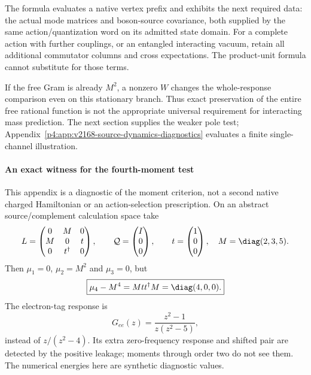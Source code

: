 \documentclass[12pt,a4paper]{article}
\begin{document}
The formula evaluates a native vertex prefix and exhibits the next required
data: the actual mode matrices and boson-source covariance, both supplied by
the same action/quantization word on its admitted state domain. For a complete
action with further couplings, or an entangled interacting vacuum, retain all
additional commutator columns and cross expectations. The product-unit
formula cannot substitute for those terms.

If the free Gram is already $M^2$, a nonzero $W$ changes the whole-response
comparison even on this stationary branch. Thus exact preservation of the
entire free rational function is not the appropriate universal requirement
for interacting mass prediction. The next section supplies the weaker pole
test; Appendix~\ref{p4:app:v2168-source-dynamics-diagnostics} evaluates a finite single-channel illustration.



\paragraph{An exact witness for the fourth-moment test}
This appendix is a diagnostic of the moment criterion, not a second native
charged Hamiltonian or an action-selection prescription. On an abstract
source/complement calculation space take
\[
 L=\begin{pmatrix}0&M&0\\M&0&t\\0&t^\dagger&0\end{pmatrix},
 \qquad \mathcal Q=\begin{pmatrix}I\\0\\0\end{pmatrix},
 \qquad t=\begin{pmatrix}1\\0\\0\end{pmatrix},\quad
 M=\diag(2,3,5).
\]
Then $\mu_1=0$, $\mu_2=M^2$ and $\mu_3=0$, but
\[
 \boxed{\mu_4-M^4=Mtt^\dagger M=\diag(4,0,0).}
\]
The electron-tag response is
\[
 G_{ee}(z)=\frac{z^2-1}{z(z^2-5)},
\]
instead of $z/(z^2-4)$. Its extra zero-frequency response and shifted pair
are detected by the positive leakage; moments through order two do not see
them. The numerical energies here are synthetic diagnostic values.
\end{document}
